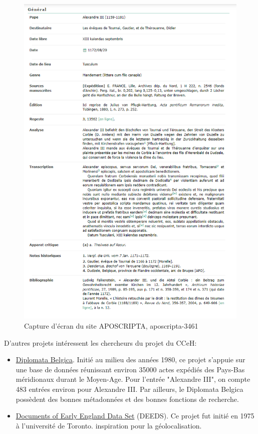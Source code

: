 \begin{figure}[h]
    \centering
    \includegraphics[width=12cm]{images/aposcripta-3461.png}
    \caption{Capture d'écran du site APOSCRIPTA, aposcripta-3461}
    \label{fig:Aposcripta}
\end{figure}


\noindent D'autres projets intéressent les chercheurs du projet du CCeH: 
\begin{itemize}
    \item \href{https://www.diplomata-belgica.be/colophon_fr.html}{Diplomata Belgica}. Initié au milieu des années 1980, ce projet s'appuie sur une base de données réunissant environ 35000 actes expédiés des Pays-Bas méridionaux durant le Moyen-Age. Pour l'entrée "Alexandre III", on compte 483 entrées environ pour Alexandre III. Par ailleurs, le Diplomata Belgica possèdent des bonnes métadonnées et des bonnes fonctions de recherche.
    \item \href{https://deeds.library.utoronto.ca/}{Documents of Early England Data Set} (DEEDS). Ce projet fut initié en 1975 à l'université de Toronto.  inspiration pour la géolocalisation.\\
    
\end{itemize}



